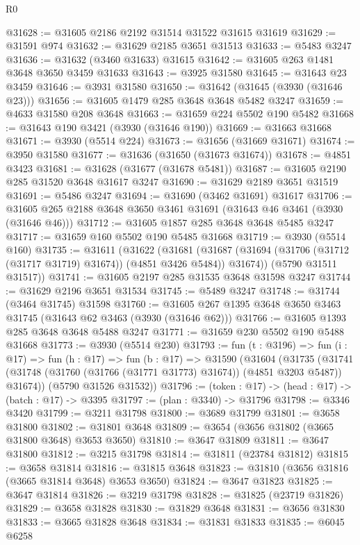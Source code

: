 \begin{lexlean}{R0}
\begin{coremodule}
@31628 := @31605 @2186 @2192 @31514 @31522 @31615 @31619
@31629 := @31591 @974
@31632 := @31629 @2185 @3651 @31513
@31633 := @5483 @3247
@31636 := @31632 (@3460 @31633) @31615
@31642 := @31605 @263 @1481 @3648 @3650 @3459 @31633
@31643 := @3925 @31580
@31645 := @31643 @23 @3459
@31646 := @3931 @31580
@31650 := @31642 (@31645 (@3930 (@31646 @23)))
@31656 := @31605 @1479 @285 @3648 @3648 @5482 @3247
@31659 := @4633 @31580 @208 @3648
@31663 := @31659 @224 @5502 @190 @5482
@31668 := @31643 @190 @3421 (@3930 (@31646 @190))
@31669 := @31663 @31668
@31671 := @3930 (@5514 @224)
@31673 := @31656 (@31669 @31671)
@31674 := @3950 @31580
@31677 := @31636 (@31650 (@31673 @31674))
@31678 := @4851 @3423
@31681 := @31628 (@31677 (@31678 @5481))
@31687 := @31605 @2190 @285 @31520 @3648 @31617 @3247
@31690 := @31629 @2189 @3651 @31519
@31691 := @5486 @3247
@31694 := @31690 (@3462 @31691) @31617
@31706 := @31605 @265 @2188 @3648 @3650 @3461 @31691 (@31643 @46 @3461 (@3930 (@31646 @46)))
@31712 := @31605 @1857 @285 @3648 @3648 @5485 @3247
@31717 := @31659 @160 @5502 @190 @5485 @31668
@31719 := @3930 (@5514 @160)
@31735 := @31611
    (@31622
      (@31681 (@31687 (@31694 (@31706 (@31712 (@31717 @31719) @31674)) (@4851 @3426 @5484)) @31674))
      (@5790 @31511 @31517))
@31741 := @31605 @2197 @285 @31535 @3648 @31598 @3247
@31744 := @31629 @2196 @3651 @31534
@31745 := @5489 @3247
@31748 := @31744 (@3464 @31745) @31598
@31760 := @31605 @267 @1395 @3648 @3650 @3463 @31745 (@31643 @62 @3463 (@3930 (@31646 @62)))
@31766 := @31605 @1393 @285 @3648 @3648 @5488 @3247
@31771 := @31659 @230 @5502 @190 @5488 @31668
@31773 := @3930 (@5514 @230)
@31793 := fun (t : @3196) =>
  fun (i : @17) =>
  fun (h : @17) =>
  fun (b : @17) =>
  @31590
    (@31604
      (@31735 (@31741 (@31748 (@31760 (@31766 (@31771 @31773) @31674)) (@4851 @3203 @5487)) @31674))
      (@5790 @31526 @31532))
@31796 := (token : @17) -> (head : @17) -> (batch : @17) -> @3395
@31797 := (plan : @3340) -> @31796
@31798 := @3346 @3420
@31799 := @3211 @31798
@31800 := @3689 @31799
@31801 := @3658 @31800
@31802 := @31801 @3648
@31809 := @3654 (@3656 @31802 (@3665 @31800 @3648) @3653 @3650)
@31810 := @3647 @31809
@31811 := @3647 @31800
@31812 := @3215 @31798
@31814 := @31811 (@23784 @31812)
@31815 := @3658 @31814
@31816 := @31815 @3648
@31823 := @31810 (@3656 @31816 (@3665 @31814 @3648) @3653 @3650)
@31824 := @3647 @31823
@31825 := @3647 @31814
@31826 := @3219 @31798
@31828 := @31825 (@23719 @31826)
@31829 := @3658 @31828
@31830 := @31829 @3648
@31831 := @3656 @31830
@31833 := @3665 @31828 @3648
@31834 := @31831 @31833
@31835 := @6045 @6258

\end{coremodule}
\end{lexlean}
